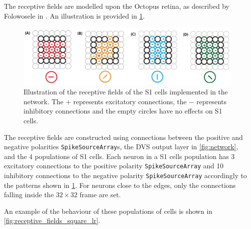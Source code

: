 The receptive fields are modelled upon the Octopus retina, as described by Folowosele in \cite{Folowosele2011}. An illustration is provided in \cref{fig:receptive_fields}.

\begin{figure}[ht]
\centering
\includegraphics[scale=0.6]{images/development/receptive_fields.png}
\caption[Receptive Fields]{Illustration of the receptive fields of the \textsc{S1} cells implemented in the network. The $+$ represents excitatory connections, the $-$ represents inhibitory connections and the empty circles have no effects on \textsc{S1} cells.}
\label{fig:receptive_fields}
\end{figure}

The receptive fields are constructed using connections between the positive and negative polarities \texttt{SpikeSourceArray}s, the DVS output layer in \cref{fig:network}, and the 4 populations of \textsc{S1} cells. Each neuron in a \textsc{S1} cells population has 3 excitatory connections to the positive polarity \texttt{SpikeSourceArray} and 10 inhibitory connections to the negative polarity \texttt{SpikeSourceArray} accordingly to the patterns shown in \cref{fig:receptive_fields}. For neurons close to the edges, only the connections falling inside the $32 \times 32$ frame are set.

An example of the behaviour of these populations of cells is shown in \cref{fig:receptive_fields_square_lr}.

